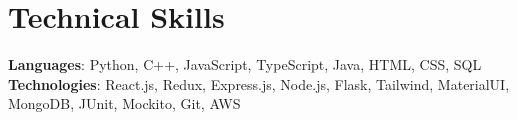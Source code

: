 \section{Technical Skills}
\begin{itemize}[leftmargin=0.15in, label={}]
    \small{\item{
        \textbf{Languages}{: Python, C++, JavaScript, TypeScript, Java, HTML, CSS, SQL} \\
     
        \textbf{Technologies}{: React.js, Redux, Express.js, Node.js, Flask, Tailwind, MaterialUI, MongoDB, JUnit, Mockito, Git, AWS} \\
    }}
\end{itemize}